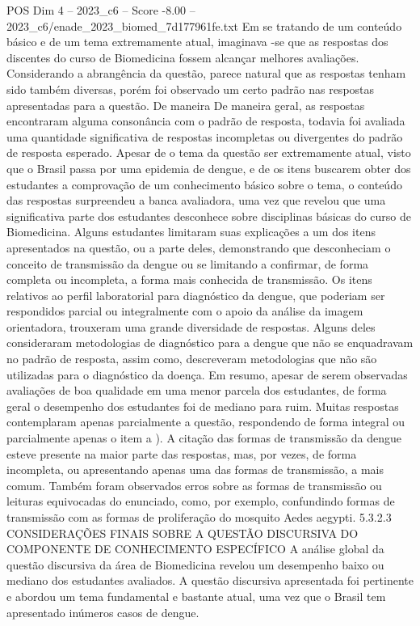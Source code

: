 \begin{textsample}{POS Dim 4 – 2023\_c6 – Score -8.00 – 2023\_c6/enade\_2023\_biomed\_7d177961fe.txt}
Em se tratando de um conteúdo básico e de um tema extremamente atual, imaginava -se que as respostas dos discentes do curso de Biomedicina fossem alcançar melhores avaliações.
Considerando a abrangência da questão, parece natural que as respostas tenham sido também diversas, porém foi observado um certo padrão nas respostas apresentadas para a questão.
De maneira De maneira geral, as respostas encontraram alguma consonância com o padrão de resposta, todavia foi avaliada uma quantidade significativa de respostas incompletas ou divergentes do padrão de resposta esperado.
Apesar de o tema da questão ser extremamente atual, visto que o Brasil passa por uma epidemia de dengue, e de os itens buscarem obter dos estudantes a comprovação de um conhecimento básico sobre o tema, o conteúdo das respostas surpreendeu a banca avaliadora, uma vez que revelou que uma significativa parte dos estudantes desconhece sobre disciplinas básicas do curso de Biomedicina.
Alguns estudantes limitaram suas explicações a um dos itens apresentados na questão, ou a parte deles, demonstrando que desconheciam o conceito de transmissão da dengue ou se limitando a confirmar, de forma completa ou incompleta, a forma mais conhecida de transmissão.
Os itens relativos ao perfil laboratorial para diagnóstico da dengue, que poderiam ser respondidos parcial ou integralmente com o apoio da análise da imagem orientadora, trouxeram uma grande diversidade de respostas.
Alguns deles consideraram metodologias de diagnóstico para a dengue que não se enquadravam no padrão de resposta, assim como, descreveram metodologias que não são utilizadas para o diagnóstico da doença.
Em resumo, apesar de serem observadas avaliações de boa qualidade em uma menor parcela dos estudantes, de forma geral o desempenho dos estudantes foi de mediano para ruim.
Muitas respostas contemplaram apenas parcialmente a questão, respondendo de forma integral ou parcialmente apenas o item a ).
A citação das formas de transmissão da dengue esteve presente na maior parte das respostas, mas, por vezes, de forma incompleta, ou apresentando apenas uma das formas de transmissão, a mais comum.
Também foram observados erros sobre as formas de transmissão ou leituras equivocadas do enunciado, como, por exemplo, confundindo formas de transmissão com as formas de proliferação do mosquito Aedes aegypti. 5.3.2.3 CONSIDERAÇÕES FINAIS SOBRE A QUESTÃO DISCURSIVA DO COMPONENTE DE CONHECIMENTO ESPECÍFICO A análise global da questão discursiva da área de Biomedicina revelou um desempenho baixo ou mediano dos estudantes avaliados.
A questão discursiva apresentada foi pertinente e abordou um tema fundamental e bastante atual, uma vez que o Brasil tem apresentado inúmeros casos de dengue.

\end{textsample}
